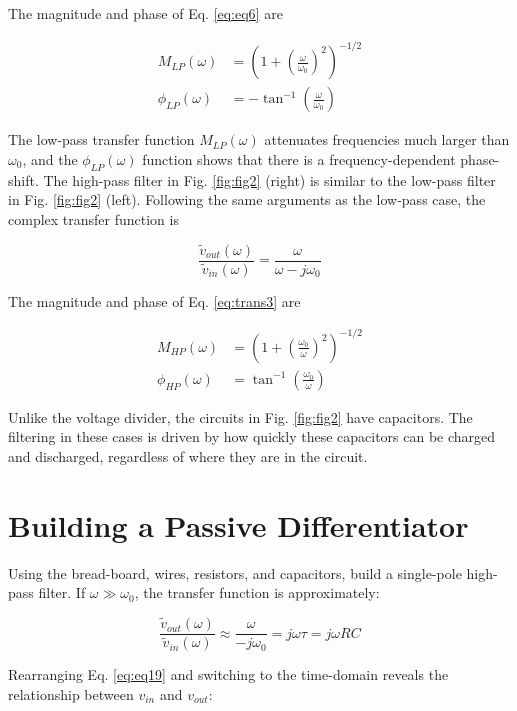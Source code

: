 \documentclass[12pt]{article}
\begin{document}
The magnitude and phase of Eq. \ref{eq:eq6} are

\begin{align}
M_{LP}(\omega) &= \left( 1 + \left( \frac{\omega}{\omega_0}\right)^2 \right)^{-1/2} \\
\phi_{LP}(\omega) &= -\tan^{-1}\left(\frac{\omega}{\omega_0}\right)
\label{eq:eq7}
\end{align}

The low-pass transfer function $M_{LP}(\omega)$ attenuates frequencies much larger than $\omega_0$, and the $\phi_{LP}(\omega)$ function shows that there is a frequency-dependent phase-shift.  The high-pass filter in Fig. \ref{fig:fig2} (right) is similar to the low-pass filter in Fig. \ref{fig:fig2} (left).  Following the same arguments as the low-pass case, the complex transfer function is

\begin{equation}
\frac{\tilde{v}_{out}(\omega)}{\tilde{v}_{in}(\omega)} = \frac{\omega}{\omega - j\omega_0}
\label{eq:trans3}
\end{equation}

The magnitude and phase of Eq. \ref{eq:trans3} are

\begin{align}
M_{HP}(\omega) &= \left( 1 + \left( \frac{\omega_0}{\omega}\right)^2 \right)^{-1/2} \\
\phi_{HP}(\omega) &= \tan^{-1}\left(\frac{\omega_0}{\omega}\right)
\end{align}

Unlike the voltage divider, the circuits in Fig. \ref{fig:fig2} have capacitors.  The filtering in these cases is driven by how quickly these capacitors can be charged and discharged, regardless of where they are in the circuit.

\section{Building a Passive Differentiator}

Using the bread-board, wires, resistors, and capacitors, build a single-pole high-pass filter.  If $\omega \gg \omega_0$, the transfer function is approximately:

\begin{equation}
\frac{\tilde{v}_{out}(\omega)}{\tilde{v}_{in}(\omega)} \approx \frac{\omega}{-j\omega_0} = j\omega \tau = j\omega RC
\label{eq:eq19}
\end{equation}

Rearranging Eq. \ref{eq:eq19} and switching to the time-domain reveals the relationship between $v_{in}$ and $v_{out}$:
\end{document}
